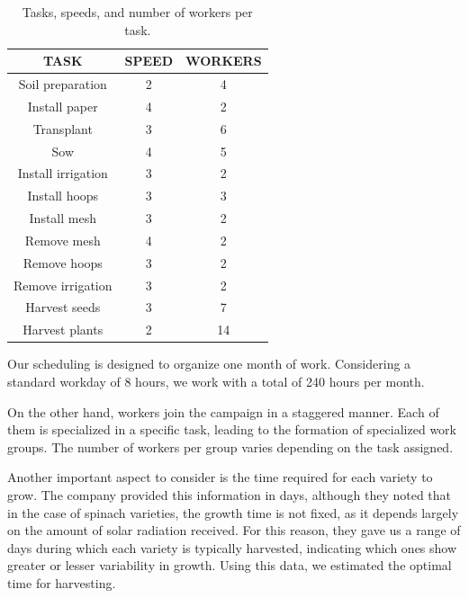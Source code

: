  \begin{table}[ht!]
    \centering
    \begin{minipage}{0.48\textwidth}
        \centering
        \begin{tabular}{|c|c|c|}
            \hline
            \rowcolor{gray!30} \textbf{\textcolor{grey3}{TASK}} & \textbf{\textcolor{grey3}{SPEED}} &  \textbf{\textcolor{grey3}{WORKERS}}\\ 
            \hline
            Soil preparation   & 2 & 4 \\ \hline
            Install paper      & 4 & 2\\ \hline
            Transplant         & 3 & 6\\ \hline
            Sow                & 4 & 5\\ \hline
            Install irrigation & 3 & 2 \\ \hline
            Install hoops      & 3 & 3 \\ \hline
            Install mesh       & 3 & 2 \\ \hline
            Remove mesh        & 4 & 2 \\ \hline
            Remove hoops       & 3 & 2 \\ \hline
            Remove irrigation  & 3 & 2 \\ \hline
            Harvest seeds      & 3 & 7 \\ \hline
            Harvest plants     & 2 & 14 \\ 
            \hline
        \end{tabular}
        \caption{Tasks, speeds, and number of workers per task.}
        \label{tab:tareas}
    \end{minipage}
    \hfill
\end{table}
Our scheduling is designed to organize one month of work. Considering a standard workday of 8 hours,  
we work with a total of 240 hours per month.

On the other hand, workers join the campaign in a staggered manner. Each of them is specialized in a specific task,  
leading to the formation of specialized work groups.  
The number of workers per group varies depending on the task assigned.

Another important aspect to consider is the time required for each variety to grow. The company provided this information in days,  
although they noted that in the case of spinach varieties, the growth time is not fixed, as it depends largely on the amount of solar radiation received.  
For this reason, they gave us a range of days during which each variety is typically harvested, indicating which ones show greater or lesser variability in growth.  
Using this data, we estimated the optimal time for harvesting.  

